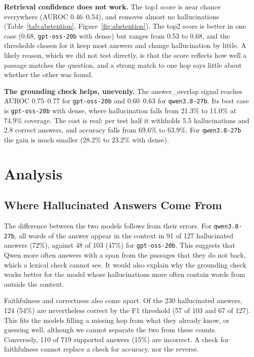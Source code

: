\documentclass[10pt,a4paper,twocolumn]{article}
\newcommand{\model}[1]{\texttt{#1}}
\begin{document}
\textbf{Retrieval confidence does not work.} The top1 score is near chance everywhere (AUROC 0.46--0.54), and removes almost no hallucinations
(Table~\ref{tab:abstention}, Figure~\ref{fig:abstention}). The top2 score is better in one case (0.68, \model{gpt-oss-20b} with dense) but ranges from 0.53 to
0.68, and the thresholds chosen for it keep most answers and change hallucination by little. A likely reason, which we did not test directly, is that the
score reflects how well a passage matches the question, and a strong match to one hop says little about whether the other was found.

\textbf{The grounding check helps, unevenly.} The answer\_overlap signal reaches AUROC 0.75--0.77 for \model{gpt-oss-20b} and 0.60--0.63 for \model{qwen3.8-27b}. Its
best case is \model{gpt-oss-20b} with dense, where hallucination falls from 21.3\% to 11.0\% at 74.9\% coverage. The cost is real: per test half it withholds 5.5
hallucinations and 2.8 correct answers, and accuracy falls from 69.6\% to 63.9\%. For \model{qwen3.8-27b} the gain is much smaller (28.2\% to 23.2\% with dense).

\section{Analysis}

\subsection{Where Hallucinated Answers Come From}
The difference between the two models follows from their errors. For \model{qwen3.8-27b}, all words of the answer appear in the context in 91 of 127
hallucinated answers (72\%), against 48 of 103 (47\%) for \model{gpt-oss-20b}. This suggests that Qwen more often answers with a span from the passages that they do not back, which a lexical check cannot see. It would also
explain why the grounding check works better for the model whose hallucinations more often contain words from outside the context.

Faithfulness and correctness also come apart. Of the 230 hallucinated answers, 124 (54\%) are nevertheless correct by the F1 threshold (57 of 103 and 67 of 127).
This fits the models filling a missing hop from what they already know, or guessing well, although we cannot separate the two from these counts.
Conversely, 110 of 719 supported answers (15\%) are incorrect. A check for faithfulness cannot replace a check for accuracy, nor the reverse.
\end{document}
